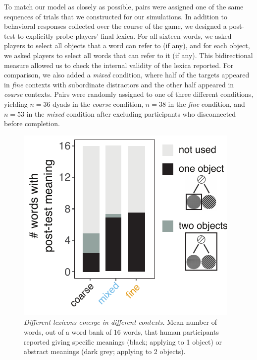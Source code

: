 To match our model as closely as possible, pairs were assigned one of the same sequences of trials that we constructed for our simulations. 
In addition to behavioral responses collected over the course of the game, we designed a post-test to explicitly probe players' final lexica. For all sixteen words, we asked players to select all objects that a word can refer to (if any), and for each object, we asked players to select all words that can refer to it (if any). 
This bidirectional measure allowed us to check the internal validity of the lexica reported.
For comparison, we also added a \emph{mixed} condition, where half of the targets appeared in \emph{fine} contexts with subordinate distractors and the other half appeared in \emph{coarse} contexts.
Pairs were randomly assigned to one of three different conditions, yielding $n=36$ dyads in the \emph{coarse} condition, $n=38$ in the \emph{fine} condition, and $n=53$ in the \emph{mixed} condition after excluding participants who disconnected before completion.


\begin{figure}[t]
\begin{center}
\includegraphics[scale=1]{./figures/Exp2_postTest}
\caption{\emph{Different lexicons emerge in different contexts.} Mean number of words, out of a word bank of 16 words, that human participants reported giving specific meanings (black; applying to 1 object) or abstract meanings (dark grey; applying to 2 objects).}
\label{fig:sec2postTest}
\end{center}
\end{figure}


